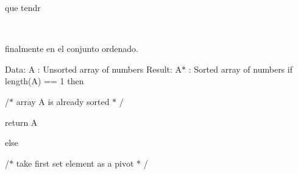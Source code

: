 \documentclass[12pt]{article}
\begin{document}
\begin{multicols}{2}
{\fontsize{11pt}{13.2pt}\selectfont que tendr\par}\par


\end{multicols}
\\
{\fontsize{11pt}{13.2pt}\selectfont finalmente  en el conjunto  ordenado.\par}\par

\begin{adjustwidth}{0.31in}{4.32in}
\begin{justify}
{\fontsize{11pt}{13.2pt}\selectfont Data: A : Unsorted  array  of numbers Result:  A$\ast$  : Sorted  array  of numbers if length(A)  == 1 then\par}
\end{justify}\par

\end{adjustwidth}

\begin{adjustwidth}{0.54in}{0.0in}
{\fontsize{11pt}{13.2pt}\selectfont /$\ast$  array  A is already  sorted  $\ast$ /\par}\par

\end{adjustwidth}

\begin{adjustwidth}{0.54in}{0.0in}
{\fontsize{11pt}{13.2pt}\selectfont return  A\par}\par

\end{adjustwidth}

\begin{adjustwidth}{0.31in}{6.61in}
\begin{justify}
{\fontsize{11pt}{13.2pt}\selectfont else\par}
\end{justify}\par

\end{adjustwidth}

\begin{adjustwidth}{0.54in}{0.0in}
{\fontsize{11pt}{13.2pt}\selectfont /$\ast$  take first set element  as a pivot $\ast$ /\par}\par

\end{adjustwidth}
\end{document}
